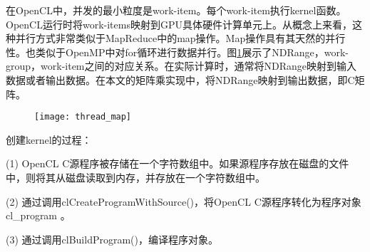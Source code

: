%
%

在OpenCL中，并发的最小粒度是work-item。每个work-item执行kernel函数。OpenCL运行时将work-items映射到GPU具体硬件计算单元上。从概念上来看，这种并行方式非常类似于MapReduce中的map操作。Map操作具有其天然的并行性。也类似于OpenMP中对for循环进行数据并行。图\ref{fig:thread_map}展示了NDRange，work-group，work-item之间的对应关系。在实际计算时，通常将NDRange映射到输入数据或者输出数据。在本文的矩阵乘实现中，将NDRange映射到输出数据，即C矩阵。
\begin{figure}[htbp]
	\centering
	\texttt{[image: thread\_map]}
	\label{fig:thread_map}
\end{figure}

%

创建kernel的过程：

(1) OpenCL C源程序被存储在一个字符数组中。如果源程序存放在磁盘的文件中，则将其从磁盘读取到内存，并存放在一个字符数组中。

(2) 通过调用clCreateProgramWithSource()，将OpenCL C源程序转化为程序对象 cl\_program 。

(3)	通过调用clBuildProgram()，编译程序对象。

